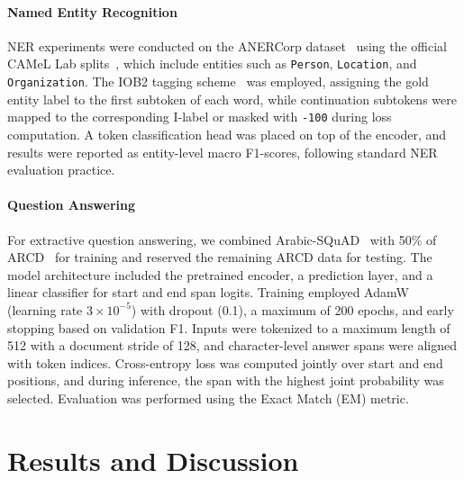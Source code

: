 \paragraph{Named Entity Recognition}
NER experiments were conducted on the ANERCorp dataset~\cite{Benajiba:2007} using the official CAMeL Lab splits~\cite{obeid2020camel}, which include entities such as \texttt{Person}, \texttt{Location}, and \texttt{Organization}. The IOB2 tagging scheme~\cite{Ramshaw1999} was employed, assigning the gold entity label to the first subtoken of each word, while continuation subtokens were mapped to the corresponding I-label or masked with \texttt{-100} during loss computation. A token classification head was placed on top of the encoder, and results were reported as entity-level macro F1-scores, following standard NER evaluation practice.

\paragraph{Question Answering}
For extractive question answering, we combined Arabic-SQuAD~\cite{Mozannar:2019} with 50\% of ARCD~\cite{mozannar-etal-2019-neural} for training and reserved the remaining ARCD data for testing. The model architecture included the pretrained encoder, a prediction layer, and a linear classifier for start and end span logits. Training employed AdamW (learning rate $3\times10^{-5}$) with dropout (0.1), a maximum of 200 epochs, and early stopping based on validation F1. Inputs were tokenized to a maximum length of 512 with a document stride of 128, and character-level answer spans were aligned with token indices. Cross-entropy loss was computed jointly over start and end positions, and during inference, the span with the highest joint probability was selected. Evaluation was performed using the Exact Match (EM) metric.




\section{Results and Discussion}

